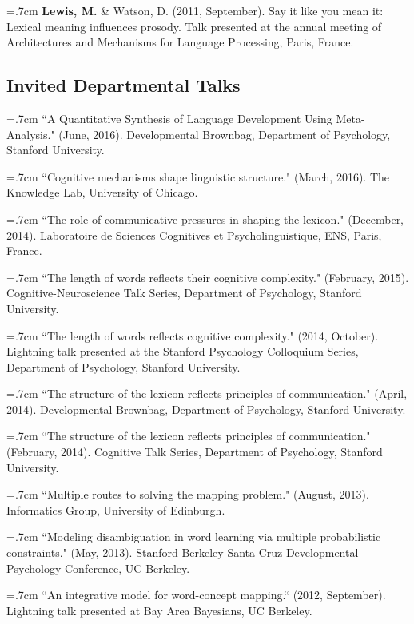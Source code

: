 \documentclass[letterpaper]{article}
\begin{document}
 \hangindent=.7cm {\bf Lewis, M.}  \& Watson, D. (2011, September). Say it like you mean it: Lexical meaning influences prosody. Talk presented at the annual meeting of Architectures and Mechanisms for Language Processing, Paris, France.
 





\subsection*{Invited Departmental Talks}

\hangindent=.7cm ``A Quantitative Synthesis of Language Development Using Meta-Analysis." (June, 2016). Developmental Brownbag, Department of Psychology,  Stanford University.

\hangindent=.7cm  ``Cognitive mechanisms shape linguistic structure."  (March, 2016). The Knowledge Lab, University of Chicago.

\hangindent=.7cm ``The role of communicative pressures in shaping the lexicon." (December, 2014). Laboratoire de Sciences Cognitives et Psycholinguistique, ENS, Paris, France.


\hangindent=.7cm ``The length of words reflects their cognitive complexity." (February, 2015). Cognitive-Neuroscience Talk Series, Department of Psychology, Stanford University.

\hangindent=.7cm ``The length of words reflects cognitive complexity." (2014, October). Lightning talk presented at the Stanford Psychology Colloquium Series, Department of Psychology, Stanford University.


\hangindent=.7cm ``The structure of the lexicon reflects principles of communication." (April, 2014). Developmental Brownbag, Department of Psychology, Stanford University.

\hangindent=.7cm ``The structure of the lexicon reflects principles of communication." (February, 2014). Cognitive Talk Series, Department of Psychology, Stanford University.

\hangindent=.7cm ``Multiple routes to solving the mapping problem." (August, 2013). Informatics Group, University of Edinburgh.
 
\hangindent=.7cm ``Modeling disambiguation in word learning via multiple probabilistic constraints." (May, 2013). Stanford-Berkeley-Santa Cruz Developmental Psychology Conference, UC Berkeley.

 \hangindent=.7cm ``An integrative model for word-concept mapping.`` (2012, September). Lightning talk presented at Bay Area Bayesians, UC Berkeley.
\end{document}
